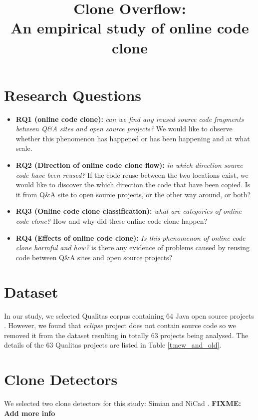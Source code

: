 \documentclass{IEEEtran}
\newcommand\FIXME[1]{\textbf{FIXME: #1}}
\begin{document}
\onecolumn

\title{Clone Overflow: \\
	An empirical study of online code clone}
\maketitle

\section*{Research Questions}
\begin{itemize}
	\item \textbf{RQ1 (online code clone):} \textit{can we find any reused source code fragments between Q\&A sites and open source projects?} We would like to observe whether this phenomenon has happened or has been happening and at what scale.
	\item \textbf{RQ2 (Direction of online code clone flow):} \textit{in which direction source code have been reused?} If the code reuse between the two locations exist, we would like to discover the which direction the code that have been copied. Is it from Q\&A site to open source projects, or the other way around, or both?
	\item \textbf{RQ3 (Online code clone classification):} \textit{what are categories of online code clone?} How and why did these online code clone happen?
	\item \textbf{RQ4 (Effects of online code clone):} \textit{ Is this phenomenon of online code clone harmful and how?} is there any evidence of problems caused by reusing code between Q\&A sites and open source projects?
\end{itemize}

\section*{Dataset}
In our study, we selected Qualitas corpus containing 64 Java open source projects \cite{QualitasCorpus}. However, we found that \textit{eclipse} project does not contain source code so we removed it from the dataset resulting in totally 63 projects being analysed. The details of the 63 Qualitas projects are listed in Table \ref{t:new_and_old}.

\section*{Clone Detectors}
We selected two clone detectors for this study: Simian \cite{simian} and NiCad \cite{Cordy,Roy2008}. \FIXME{Add more info} 
\end{document}
